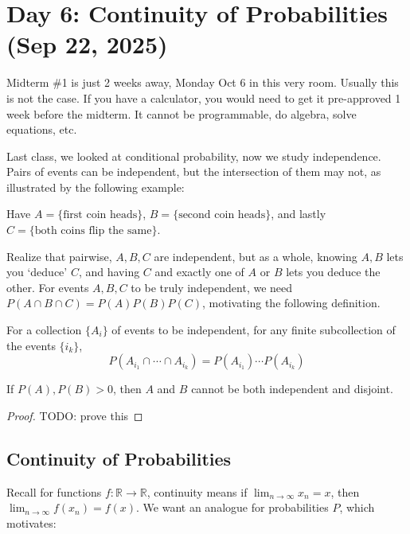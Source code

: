 \section{Day 6: Continuity of Probabilities (Sep 22, 2025)}

Midterm \#1 is just 2 weeks away, Monday Oct 6 in this very room. Usually this is not the case. If you have a calculator, you would need to get it pre-approved 1 week before the midterm. It cannot be programmable, do algebra, solve equations, etc.

Last class, we looked at conditional probability, now we study independence. Pairs of events can be independent, but the intersection of them may not, as illustrated by the following example:

\begin{example}
Have $A = \{ \text{first coin heads} \}$, $B = \{ \text{second coin heads} \}$, and lastly \\ $C = \{ \text{both coins flip the same} \}$.

Realize that pairwise, $A, B, C$ are independent, but as a whole, knowing $A, B$ lets you `deduce' $C$, and having $C$ and exactly one of $A$ or $B$ lets you deduce the other. For events $A, B, C$ to be truly independent, we need $P(A \cap B \cap C) = P(A) P(B) P(C)$, motivating the following definition.
\end{example}


\begin{definition}[Independence]
For a collection $\{ A_i \}$ of events to be independent, for any finite subcollection of the events $\{ i_k \}$, 
\[
    P(A_{i_1} \cap \cdots \cap A_{i_k}) = P(A_{i_1}) \cdots P(A_{i_k})
\]
\end{definition}

\begin{simplethm}
    If $P(A), P(B) > 0$, then $A$ and $B$ cannot be both independent and disjoint. 
\end{simplethm}

\begin{proof}
    TODO: prove this
\end{proof}

\subsection{Continuity of Probabilities}

Recall for functions $f : \mathbb{R} \to \mathbb{R}$, continuity means if $\displaystyle \lim_{ n \to \infty } x_n = x$, then $\displaystyle \lim_{ n \to \infty } f(x_n) = f(x)$. We want an analogue for probabilities $P$, which motivates:

